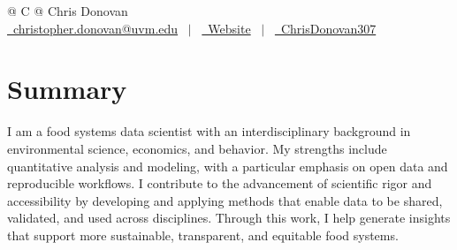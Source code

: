\documentclass[a4paper,12pt]{article}
\begin{document}
\pagestyle{empty}


\begin{tabularx}{\linewidth}{@{} C @{}}
    \Huge{Chris Donovan}                                                                         \\[7.5pt]
    \href{mailto:christopher.donovan@uvm.edu}{\raisebox{-0.05\height}\faEnvelope \ christopher.donovan@uvm.edu} \ $|$ \
    \href{https://cdonov12.w3.uvm.edu/site}{\raisebox{-0.05\height}\faGlobe \ Website} \ $|$ \
    \href{https://github.com/ChrisDonovan307}{\raisebox{-0.05\height}\faGithub\ ChrisDonovan307} \\
\end{tabularx}


\section{Summary}

I am a food systems data scientist with an interdisciplinary background in environmental science, economics, and behavior. My strengths include quantitative analysis and modeling, with a particular emphasis on open data and reproducible workflows. I contribute to the advancement of scientific rigor and accessibility by developing and applying methods that enable data to be shared, validated, and used across disciplines. Through this work, I help generate insights that support more sustainable, transparent, and equitable food systems.


\end{document}
